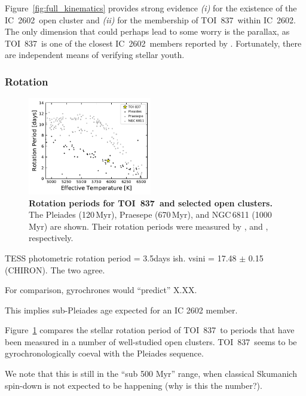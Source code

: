 \documentclass[12pt,twocolumn,tighten]{aastex62}
\newcommand{\tn}{TOI~837} %
\newcommand{\cn}{IC~2602} %
\begin{document}
Figure~\ref{fig:full_kinematics} provides strong evidence {\it (i)} for the
existence of the \cn\ open cluster and {\it (ii)} for the membership
of \tn\ within \cn.
The only dimension that could perhaps lead to some worry is the
parallax, as \tn\ is one of the closest \cn\ members reported by
\citet{cantatgaudin_gaia_2018}.
Fortunately, there are independent means of verifying stellar youth.


\subsubsection{Rotation}

\begin{figure}[t!]
	\begin{center}
		\leavevmode
		\includegraphics[width=0.48\textwidth]{f9.pdf}
	\end{center}
	\vspace{-0.7cm}
	\caption{
    {\bf Rotation periods for \tn\ and selected open clusters.}
    The Pleiades (120$\,$Myr), Praesepe (670$\,$Myr), and NGC$\,$6811
    (1000$\,$Myr) are shown.  Their rotation periods were measured by
    \citet{rebull_rotation_2016a,douglas_poking_2017,douglas_k2_2019},
    and \citet{curtis_temporary_2019}, respectively.
    \label{fig:rotation}
	}
\end{figure}

TESS photometric rotation period = 3.5days ish.
vsini = 17.48 $\pm$ 0.15 (CHIRON).
The two agree.

For comparison, gyrochrones would ``predict'' X.XX.

This implies sub-Pleiades age expected for an IC 2602 member.

Figure~\ref{fig:rotation} compares the stellar rotation period of \tn\ to
periods that have been measured in a number of well-studied open clusters.
\tn\ seems to be gyrochronologically coeval with the Pleiades sequence.

We note that this is still in the ``sub 500 Myr'' range, when classical
Skumanich spin-down is not expected to be happening (why is this the number?).
\end{document}
